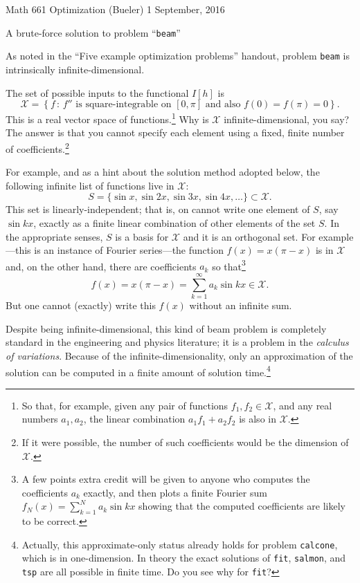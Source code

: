 \documentclass[11pt]{amsart}
\begin{document}
\scriptsize \noindent Math 661 Optimization (Bueler) \hfill 1 September, 2016
\normalsize

\medskip\bigskip
\Large
\centerline{A brute-force solution to problem ``\texttt{beam}''}

\bigskip\medskip
\normalsize

\thispagestyle{empty}

As noted in the ``Five example optimization problems'' handout, problem \texttt{beam} is intrinsically infinite-dimensional.

The set of possible inputs to the functional $I[h]$ is
    $$\mathcal{X} = \left\{f \,:\, f'' \text{ is square-integrable on } [0,\pi] \text{ and also } f(0)=f(\pi)=0\right\}.$$
This is a real vector space of functions.\footnote{So that, for example, given any pair of functions $f_1,f_2 \in \mathcal{X}$, and any real numbers $a_1,a_2$, the linear combination $a_1 f_1 + a_2 f_2$ is also in $\mathcal{X}$.}  Why is $\mathcal{X}$ infinite-dimensional, you say?  The answer is that you cannot specify each element using a fixed, finite number of coefficients.\footnote{If it were possible, the number of such coefficients would be the dimension of $\mathcal{X}$.}

For example, and as a hint about the solution method adopted below, the following infinite list of functions live in $\mathcal{X}$:
    $$S = \{\sin x, \sin 2 x, \sin 3 x, \sin 4 x, \dots\} \subset \mathcal{X}.$$
This set is linearly-independent; that is, on cannot write one element of $S$, say $\sin k x$, exactly as a finite linear combination of other elements of the set $S$.  In the appropriate senses, $S$ is a basis for $\mathcal{X}$ and it is an orthogonal set.  For example---this is an instance of Fourier series---the function $f(x) = x (\pi-x)$ is in $\mathcal{X}$ and, on the other hand, there are coefficients $a_k$ so that\footnote{A few points extra credit will be given to anyone who computes the coefficients $a_k$ exactly, and then plots a finite Fourier sum $f_N(x) = \sum_{k=1}^N a_k \sin k x$ showing that the computed coefficients are likely to be correct.}
    $$f(x) = x (\pi-x) = \sum_{k=1}^\infty a_k \sin k x \in \mathcal{X}.$$
But one cannot (exactly) write this $f(x)$ without an infinite sum.

Despite being infinite-dimensional, this kind of beam problem is completely standard in the engineering and physics literature; it is a problem in the \emph{calculus of variations}.  Because of the infinite-dimensionality, only an approximation of the solution can be computed in a finite amount of solution time.\footnote{Actually, this approximate-only status already holds for problem \texttt{calcone}, which is in one-dimension.  In theory the exact solutions of \texttt{fit}, \texttt{salmon}, and \texttt{tsp} are all possible in finite time.  Do you see why for \texttt{fit}?}
\end{document}
